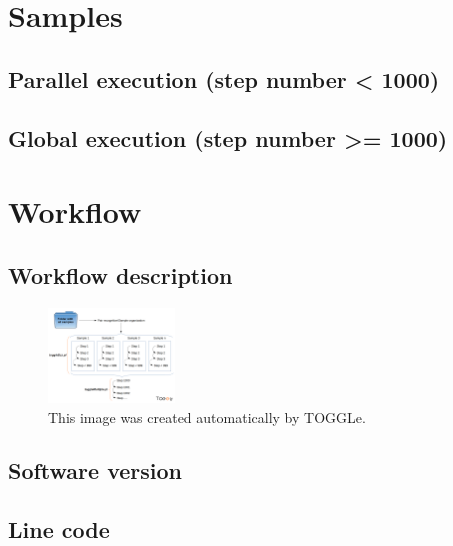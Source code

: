 \documentclass[a4paper]{article}
\begin{document}


\section{Samples}

\subsection{Parallel execution (step number < 1000)}



\subsection{Global execution (step number >= 1000)}


\section{Workflow}

\subsection{Workflow description}

\begin{figure}[ht]
\centering
\includegraphics[width=0.3\textwidth]{togglePipeline.png}
\caption{\label{fig:worflow}This image was created automatically by TOGGLe.}
\end{figure}

\subsection{Software version}




\subsection{Line code}
\end{document}
